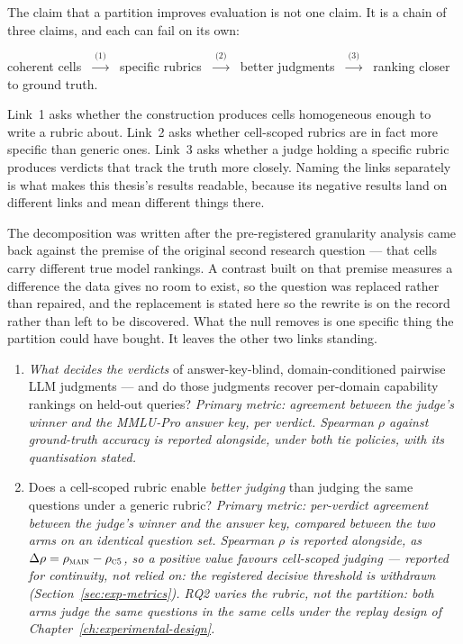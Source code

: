 The claim that a partition improves evaluation is not one claim. It is
a chain of three claims, and each can fail on its own:

\begin{center}
coherent cells
$\;\xrightarrow{\;\text{(1)}\;}\;$ specific rubrics
$\;\xrightarrow{\;\text{(2)}\;}\;$ better judgments
$\;\xrightarrow{\;\text{(3)}\;}\;$ ranking closer to ground truth.
\end{center}

Link~1 asks whether the construction produces cells homogeneous enough
to write a rubric about. Link~2 asks whether cell-scoped rubrics are in
fact more specific than generic ones. Link~3 asks whether a judge
holding a specific rubric produces verdicts that track the truth more
closely. Naming the links separately is what makes this thesis's
results readable, because its negative results land on different links
and mean different things there.

The decomposition was written after the pre-registered granularity
analysis came back against the premise of the original second research
question --- that cells carry different true model rankings. A
contrast built on that premise measures a difference the data gives no
room to exist, so the question was replaced rather than repaired, and
the replacement is stated here so the rewrite is on the record rather
than left to be discovered. What the null removes is one specific
thing the partition could have bought. It leaves the other two links
standing.

\begin{enumerate}

    \item[\textbf{RQ1.}] \emph{What decides the verdicts} of
    answer-key-blind, domain-conditioned pairwise LLM judgments --- and
    do those judgments recover per-domain capability rankings on
    held-out queries?
    \textit{Primary metric: agreement between the judge's winner and
    the MMLU-Pro answer key, per verdict. Spearman $\rho$ against
    ground-truth accuracy is reported alongside, under both tie
    policies, with its quantisation stated.}

    \item[\textbf{RQ2.}] Does a cell-scoped rubric enable \emph{better
    judging} than judging the same questions under a generic rubric?
    \textit{Primary metric: per-verdict agreement between the judge's
    winner and the answer key, compared between the two arms on an
    identical question set. Spearman $\rho$ is reported alongside, as
    $\Delta\rho = \rho_{\textsc{main}} - \rho_{\textsc{c5}}$, so a
    positive value favours cell-scoped judging --- reported for
    continuity, not relied on: the registered decisive threshold is
    withdrawn (Section~\ref{sec:exp-metrics}). RQ2 varies the rubric,
    not the partition: both arms judge the same questions in the same
    cells under the replay design of
    Chapter~\ref{ch:experimental-design}.}

\end{enumerate}


